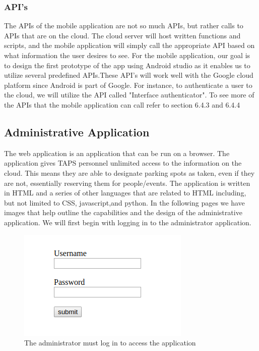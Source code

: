 \documentclass[paper=a4, fontsize=12pt]{scrartcl}
\numberwithin{equation}{section}		%
\numberwithin{figure}{section}			%
\numberwithin{table}{section}				%
\begin{document}
\subsubsection{API's}
The APIs of the mobile application are not so much APIs, but rather calls to APIs that are on the cloud. The cloud server will host written functions and scripts, and the mobile application will simply call the appropriate API based on what information the user desires to see. For the mobile application, our goal is to design the first prototype of the app using Android studio as it enables us to utilize several predefined APIs.These API's will work well with the Google cloud platform since Android is part of Google. For instance, to authenticate a user to the cloud, we will utilize the API called "Interface authenticator". To see more of the APIs that the mobile application can call refer to section 6.4.3 and 6.4.4
\subsection{Administrative Application}
The web application is an application that can be run on a browser. The application gives TAPS personnel unlimited access to the information on the cloud. This means they are able to designate parking spots as taken, even if they are not, essentially reserving them for people/events. The application is written in HTML and a series of other languages that are related to HTML including, but not limited to CSS, javascript,and python. In the following pages we have images that help outline the capabilities and the design of the administrative application. We will first begin with logging in to the administrator application.

\begin{figure}[H]
\centering
\includegraphics{adminAppPics/loginPage.png}
\caption{The administrator must log in to access the application}
\label{adminMenu}
\end{figure}
\end{document}
